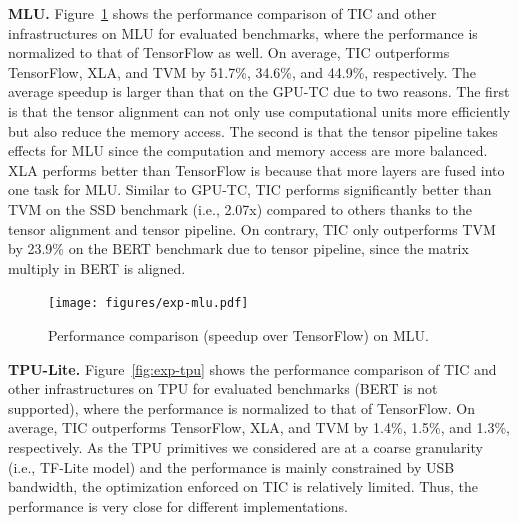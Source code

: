 \textbf{MLU.} Figure~\ref{fig:exp-mlu} shows the performance comparison of TIC and other infrastructures on MLU for evaluated benchmarks, where the performance is normalized to that of TensorFlow as well. On average, TIC outperforms TensorFlow, XLA, and TVM by 51.7\%, 34.6\%, and 44.9\%, respectively. The average speedup is larger than that on the GPU-TC due to two reasons. The first is that the tensor alignment can not only use computational units more efficiently but also reduce the memory access. The second is that the tensor pipeline takes effects for MLU since the computation and memory access are more balanced. XLA performs better than TensorFlow is because that more layers are fused into one task for MLU. Similar to GPU-TC, TIC performs significantly better than TVM on the SSD benchmark (i.e., 2.07x) compared to others thanks to the tensor alignment and tensor pipeline. On contrary, TIC only outperforms TVM by 23.9\% on the BERT benchmark due to tensor pipeline, since the matrix multiply in BERT is aligned.



\begin{figure}
  \centering
\texttt{[image: figures/exp-mlu.pdf]}
\vspace{-5pt}
\caption{\footnotesize Performance comparison (speedup over TensorFlow) on MLU.}
\label{fig:exp-mlu}
\vspace{-20pt}
\end{figure}

\textbf{TPU-Lite.} Figure~\ref{fig:exp-tpu} shows the performance comparison of TIC and other infrastructures on TPU for evaluated benchmarks (BERT is not supported), where the performance is normalized to that of TensorFlow. On average, TIC outperforms TensorFlow, XLA, and TVM by 1.4\%, 1.5\%, and 1.3\%, respectively. As the TPU primitives we considered are at a coarse granularity (i.e., TF-Lite model) and the performance is mainly constrained by USB bandwidth, the optimization enforced on TIC is relatively limited. Thus, the performance is very close for different implementations.


